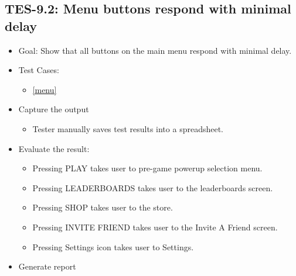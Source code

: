 \subsection{TES-9.2: Menu buttons respond with minimal delay}
\begin{itemize}
\item Goal: Show that all buttons on the main menu respond with minimal delay.
\item Test Cases: 
\begin{itemize}
\item \ref{menu}
\end{itemize}
\item Capture the output
\begin{itemize}
\item Tester manually saves test results into a spreadsheet.
\end{itemize}
\item Evaluate the result: 

\begin{itemize}
\item Pressing PLAY takes user to pre-game powerup selection menu.
\item Pressing LEADERBOARDS takes user to the leaderboards screen.
\item Pressing SHOP takes user to the store.
\item Pressing INVITE FRIEND takes user to the Invite A Friend screen.
\item Pressing Settings icon takes user to Settings.
\end{itemize}
\item Generate report
\end{itemize}




